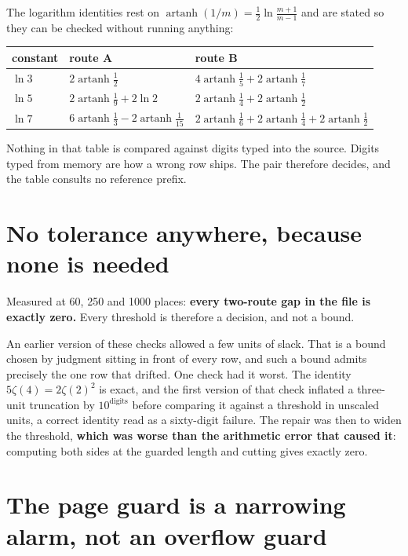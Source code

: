 The logarithm identities rest on \(\operatorname{artanh}(1/m) = \frac{1}{2}\ln\frac{m+1}{m-1}\) and
are stated so they can be checked without running anything:

\begin{center}
\begin{tabular}{@{}lll@{}}
\toprule
constant & route A & route B \\
\midrule
\(\ln 3\) & \(2\operatorname{artanh}\frac{1}{2}\) & \(4\operatorname{artanh}\frac{1}{5} + 2\operatorname{artanh}\frac{1}{7}\) \\
\(\ln 5\) & \(2\operatorname{artanh}\frac{1}{9} + 2\ln 2\) & \(2\operatorname{artanh}\frac{1}{4} + 2\operatorname{artanh}\frac{1}{2}\) \\
\(\ln 7\) & \(6\operatorname{artanh}\frac{1}{3} - 2\operatorname{artanh}\frac{1}{15}\) & \(2\operatorname{artanh}\frac{1}{6} + 2\operatorname{artanh}\frac{1}{4} + 2\operatorname{artanh}\frac{1}{2}\) \\
\bottomrule
\end{tabular}
\end{center}

Nothing in that table is compared against digits typed into the source. Digits typed from memory are
how a wrong row ships. The pair therefore decides, and the table consults no reference prefix.

\section{No tolerance anywhere, because none is needed}

Measured at 60, 250 and 1000 places: \textbf{every two-route gap in the file is exactly zero.} Every
threshold is therefore a decision, and not a bound.

An earlier version of these checks allowed a few units of slack. That is a bound chosen by judgment
sitting in front of every row, and such a bound admits precisely the one row that drifted. One check
had it worst. The identity \(5\zeta(4) = 2\zeta(2)^2\) is exact, and the first version of that check
inflated a three-unit truncation by \(10^{\text{digits}}\) before comparing it against a threshold in
unscaled units, a correct identity read as a sixty-digit failure. The repair was then to widen the
threshold, \textbf{which was worse than the arithmetic error that caused it}: computing both sides at
the guarded length and cutting gives exactly zero.

\section{The page guard is a narrowing alarm, not an overflow guard}

